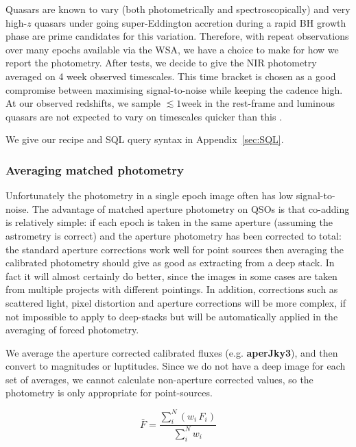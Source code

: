 \documentclass[usenatbib]{mnras}
\begin{document}
    Quasars are known to vary (both photometrically and spectroscopically)
and very high-$z$ quasars under going super-Eddington accretion during
a rapid BH growth phase are prime candidates for this variation.
Therefore, with repeat observations over many epochs available via the
WSA, we have a choice to make for how we report the photometry. After
tests, we decide to give the NIR photometry averaged on 4 week
observed timescales. This time bracket is chosen as a good compromise
between maximising signal-to-noise while keeping the cadence high. At
our observed redshifts, we sample $\lesssim1$week in the rest-frame
and luminous quasars are not expected to vary on timescales quicker
than this \citep[e.g., ][]{Lawrence2016_ASPC}. 
 
We give our recipe and SQL query syntax in Appendix~\ref{sec:SQL}.

    
    \subsubsection{Averaging matched photometry}
    Unfortunately the photometry in a single epoch image often has low
    signal-to-noise. The advantage of matched aperture photometry on QSOs is that
    co-adding is relatively simple: if each epoch is taken in the same aperture
    (assuming the astrometry is correct) and the aperture photometry has been
    corrected to total: the standard aperture corrections work well for point
    sources then averaging the calibrated photometry should give as good as
    extracting from a deep stack. In fact it will almost certainly do better, since
    the images in some cases are taken from multiple projects with different
    pointings. In addition, corrections such as scattered light, pixel distortion
    and aperture corrections will be more complex, if not impossible to apply to
    deep-stacks but will be automatically applied in the averaging of forced
    photometry. 
    
    We average the aperture corrected calibrated fluxes (e.g. {\bf aperJky3}), and
    then convert to magnitudes or luptitudes. Since we do not have a deep image for
    each set of averages, we cannot calculate non-aperture corrected values, so the
    photometry is only appropriate for point-sources. 
    
    \begin{equation}
      \bar{F} = \frac{\sum_i^N (w_i\,F_i)}{\sum_i^N w_i}  
      \label{eq:avg}
    \end{equation}
    
\end{document}
